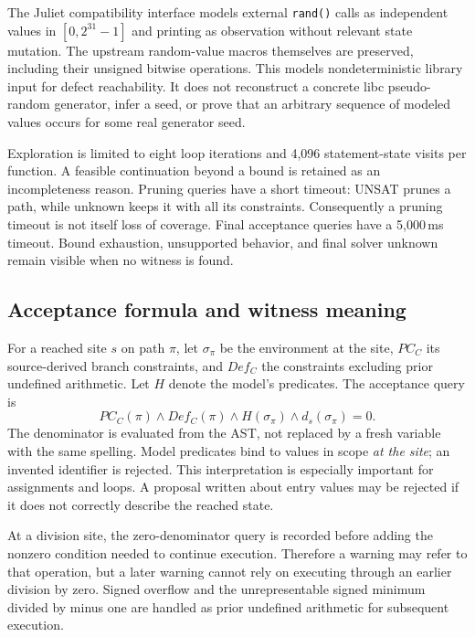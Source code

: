\documentclass[sigconf]{acmart}
\begin{document}
The Juliet compatibility interface models external \texttt{rand()} calls as
independent values in $[0,2^{31}-1]$ and printing as observation without relevant
state mutation. The upstream random-value macros themselves are preserved,
including their unsigned bitwise operations. This models nondeterministic
library input for defect reachability. It does not reconstruct a concrete libc
pseudo-random generator, infer a seed, or prove that an arbitrary sequence of
modeled values occurs for some real generator seed.

Exploration is limited to eight loop iterations and 4,096 statement-state
visits per function. A feasible continuation beyond a bound is retained as an
incompleteness reason. Pruning queries have a short timeout: UNSAT prunes a
path, while unknown keeps it with all its constraints. Consequently a pruning
timeout is not itself loss of coverage. Final acceptance queries have a
5,000\,ms timeout. Bound exhaustion, unsupported behavior, and final solver
unknown remain visible when no witness is found.

\subsection{Acceptance formula and witness meaning}
For a reached site $s$ on path $\pi$, let $\sigma_\pi$ be the environment at the
site, $PC_C$ its source-derived branch constraints, and $Def_C$ the constraints
excluding prior undefined arithmetic. Let $H$ denote the model's predicates.
The acceptance query is
\begin{equation}
 PC_C(\pi) \land Def_C(\pi) \land H(\sigma_\pi)
 \land d_s(\sigma_\pi)=0.
\end{equation}
The denominator is evaluated from the AST, not replaced by a fresh variable
with the same spelling. Model predicates bind to values in scope \emph{at the
site}; an invented identifier is rejected. This interpretation is especially
important for assignments and loops. A proposal written about entry values may
be rejected if it does not correctly describe the reached state.

At a division site, the zero-denominator query is recorded before adding the
nonzero condition needed to continue execution. Therefore a warning may refer
to that operation, but a later warning cannot rely on executing through an
earlier division by zero. Signed overflow and the unrepresentable signed
minimum divided by minus one are handled as prior undefined arithmetic for
subsequent execution.
\end{document}
